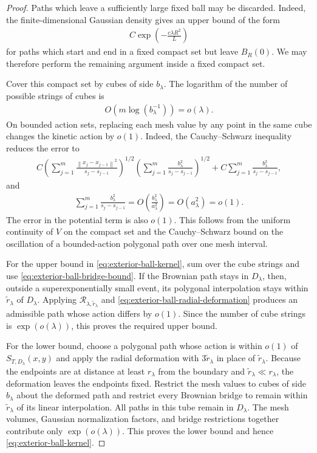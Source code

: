 \documentclass[a4paper,10pt]{article}
\numberwithin{equation}{section}
\theoremstyle{plain}
\theoremstyle{plain}
\theoremstyle{plain}
\theoremstyle{plain}
\theoremstyle{plain}
\theoremstyle{remark}
\theoremstyle{definition}
\newcommand\norm[1]{\left\lVert#1\right\rVert}
\newcommand{\eq}[1]{\begin{align*}#1\end{align*}}
\newcommand{\br}[1]{\left(#1\right)}
\begin{document}
\begin{proof}
Paths which leave a sufficiently large fixed ball may be discarded.
Indeed, the finite-dimensional Gaussian density gives an upper bound
of the form
\eq{
C
\exp\left(
-\frac{c\lambda R^2}{L}
\right)
}
for paths which start and end in a fixed compact set but leave
$B_R(0)$. We may therefore perform the remaining argument inside a
fixed compact set.

Cover this compact set by cubes of side $b_\lambda$. The logarithm
of the number of possible strings of cubes is
\eq{
O\br{
m\log(b_\lambda^{-1})
}
=
o(\lambda).
}
On bounded action sets, replacing each mesh value by any point in
the same cube changes the kinetic action by $o(1)$. Indeed, the
Cauchy--Schwarz inequality reduces the error to
\eq{
C
\left(
\sum_{j=1}^m
\frac{
\norm{x_j-x_{j-1}}^2
}{
s_j-s_{j-1}
}
\right)^{1/2}
\left(
\sum_{j=1}^m
\frac{
b_\lambda^2
}{
s_j-s_{j-1}
}
\right)^{1/2}
+
C
\sum_{j=1}^m
\frac{
b_\lambda^2
}{
s_j-s_{j-1}
},
}
and
\eq{
\sum_{j=1}^m
\frac{
b_\lambda^2
}{
s_j-s_{j-1}
}
=
O\left(
\frac{
b_\lambda^2
}{
a_\lambda^2
}
\right)
=
O(a_\lambda^2)
=
o(1).
}
The error in the potential term is also $o(1)$. This follows from
the uniform continuity of $V$ on the compact set and the
Cauchy--Schwarz bound on the oscillation of a bounded-action
polygonal path over one mesh interval.

For the upper bound in
\cref{eq:exterior-ball-kernel}, sum over the cube strings and use
\cref{eq:exterior-ball-bridge-bound}. If the Brownian path stays in
$D_\lambda$, then, outside a superexponentially small event, its
polygonal interpolation stays within
$\widetilde r_\lambda$ of $D_\lambda$. Applying
$\mathcal R_{\lambda,\widetilde r_\lambda}$ and
\cref{eq:exterior-ball-radial-deformation} produces an admissible
path whose action differs by $o(1)$. Since the number of cube strings
is $\exp(o(\lambda))$, this proves the required upper bound.

For the lower bound, choose a polygonal path whose action is within
$o(1)$ of $S_{T,D_\lambda}(x,y)$ and apply the radial deformation
with $3\widetilde r_\lambda$ in place of
$\widetilde r_\lambda$. Because the endpoints are at distance at
least $r_\lambda$ from the boundary and
$\widetilde r_\lambda\ll r_\lambda$, the deformation leaves the
endpoints fixed. Restrict the mesh values to cubes of side
$b_\lambda$ about the deformed path and restrict every Brownian bridge
to remain within $\widetilde r_\lambda$ of its linear interpolation.
All paths in this tube remain in $D_\lambda$. The mesh volumes,
Gaussian normalization factors, and bridge restrictions together
contribute only $\exp(o(\lambda))$. This proves the lower bound and
hence \cref{eq:exterior-ball-kernel}.


\end{proof}
\end{document}
